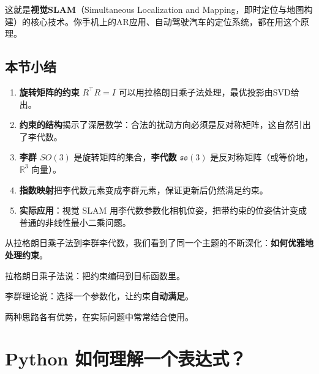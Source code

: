 这就是\textbf{视觉SLAM}（Simultaneous Localization and Mapping，即时定位与地图构建）的核心技术。你手机上的AR应用、自动驾驶汽车的定位系统，都在用这个原理。


\subsection*{本节小结}

\begin{enumerate}
    \item \textbf{旋转矩阵的约束} $R^\top R = I$ 可以用拉格朗日乘子法处理，最优投影由SVD给出。
    
    \item \textbf{约束的结构}揭示了深层数学：合法的扰动方向必须是反对称矩阵，这自然引出了李代数。
    
    \item \textbf{李群 $SO(3)$} 是旋转矩阵的集合，\textbf{李代数 $\mathfrak{so}(3)$} 是反对称矩阵（或等价地，$\mathbb{R}^3$ 向量）。
    
    \item \textbf{指数映射}把李代数元素变成李群元素，保证更新后仍然满足约束。
    
    \item \textbf{实际应用}：视觉 SLAM 用李代数参数化相机位姿，把带约束的位姿估计变成普通的非线性最小二乘问题。
\end{enumerate}

\begin{remark}
从拉格朗日乘子法到李群李代数，我们看到了同一个主题的不断深化：\textbf{如何优雅地处理约束}。

拉格朗日乘子法说：把约束编码到目标函数里。

李群理论说：选择一个参数化，让约束\textbf{自动满足}。

两种思路各有优势，在实际问题中常常结合使用。
\end{remark}


\section*{Python 如何理解一个表达式？}


